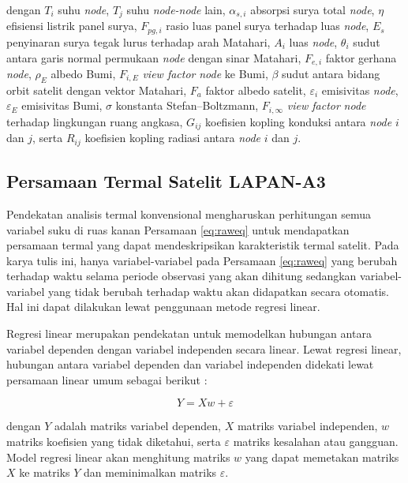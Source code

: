 dengan $T_i$ suhu \textit{node}, $T_j$ suhu \textit{node-node} lain,
$\alpha_{s,i}$ absorpsi surya total \textit{node}, $\eta$ efisiensi listrik panel surya,
$F_{pg,i}$ rasio luas panel surya terhadap luas \textit{node}, $E_s$ penyinaran surya
tegak lurus terhadap arah Matahari, $A_i$ luas \textit{node}, $\theta_i$ sudut antara
garis normal permukaan \textit{node} dengan sinar Matahari, $F_{e,i}$ faktor gerhana
\textit{node}, $\rho_E$ albedo Bumi, $F_{i,E}$ \textit{view factor} \textit{node} ke Bumi, $\beta$ sudut
antara bidang orbit satelit dengan vektor Matahari, $F_a$ faktor albedo
satelit, $\varepsilon_i$ emisivitas \textit{node}, $\varepsilon_E$ emisivitas Bumi, $\sigma$
konstanta Stefan–Boltzmann, $F_{i,\infty}$ \textit{view factor} \textit{node} terhadap
lingkungan ruang angkasa, $G_{ij}$ koefisien kopling konduksi antara \textit{node} $i$
dan $j$, serta $R_{ij}$ koefisien kopling radiasi antara \textit{node} $i$ dan $j$.

\subsection{Persamaan Termal Satelit LAPAN-A3}

Pendekatan analisis termal konvensional mengharuskan perhitungan semua variabel
suku di ruas kanan Persamaan \ref{eq:raweq} untuk mendapatkan persamaan termal
yang dapat mendeskripsikan karakteristik termal satelit. Pada karya tulis ini,
hanya variabel-variabel pada Persamaan \ref{eq:raweq} yang berubah terhadap
waktu selama periode observasi yang akan dihitung sedangkan variabel-variabel
yang tidak berubah terhadap waktu akan didapatkan secara otomatis. Hal ini
dapat dilakukan lewat penggunaan metode regresi linear.

Regresi linear merupakan pendekatan untuk memodelkan hubungan antara variabel
dependen dengan variabel independen secara linear. Lewat regresi linear,
hubungan antara variabel dependen dan variabel independen didekati lewat
persamaan linear umum sebagai berikut \cite{freedman2009}:

\begin{equation}
\label{eq:reglinear}
Y = Xw + \varepsilon
\end{equation}

dengan $Y$ adalah matriks variabel dependen, $X$ matriks variabel independen,
$w$ matriks koefisien yang tidak diketahui, serta $\varepsilon$ matriks
kesalahan atau gangguan. Model regresi linear akan menghitung matriks $w$ yang dapat memetakan matriks $X$ ke matriks $Y$ dan meminimalkan matriks $\varepsilon$.

